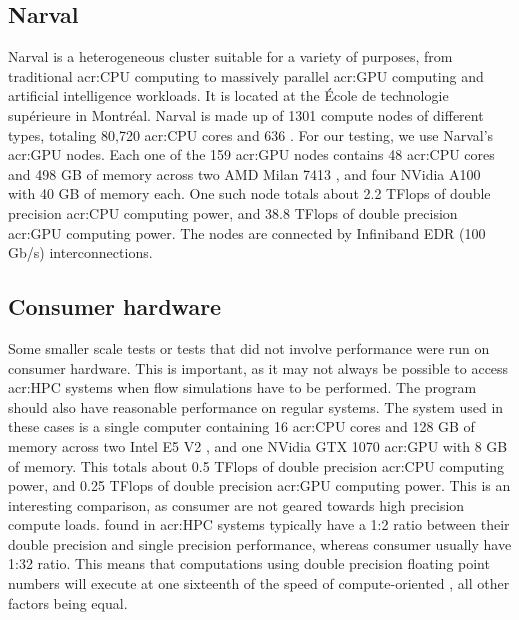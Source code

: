 \subsection{Narval}\label{subsection:results:platforms:narval}

Narval is a heterogeneous cluster suitable for a variety of purposes, from traditional
\acrshort{acr:CPU} computing to massively parallel \acrshort{acr:GPU} computing and artificial
intelligence workloads. It is located at the École de technologie supérieure in Montréal. Narval is
made up of 1301 compute nodes of different types, totaling 80,720 \acrshort{acr:CPU} cores and 636
. For our testing, we use Narval's \acrshort{acr:GPU} nodes. Each one of the 159
\acrshort{acr:GPU} nodes contains 48 \acrshort{acr:CPU} cores and 498 GB of memory across two AMD
Milan 7413 , and four NVidia A100  with 40 GB of memory
each. One such node totals about 2.2 TFlops of double precision \acrshort{acr:CPU} computing power,
and 38.8 TFlops of double precision \acrshort{acr:GPU} computing power. The nodes are connected by
Infiniband EDR (100 Gb/s) interconnections.

\subsection{Consumer hardware}\label{subsection:results:platforms:consumer}

Some smaller scale tests or tests that did not involve performance were run on consumer hardware.
This is important, as it may not always be possible to access \acrshort{acr:HPC} systems when flow
simulations have to be performed. The program should also have reasonable performance on regular
systems. The system used in these cases is a single computer containing 16 \acrshort{acr:CPU} cores
and 128 GB of memory across two Intel E5 V2 , and one NVidia GTX
1070 \acrshort{acr:GPU} with 8 GB of memory. This totals about 0.5 TFlops of double precision
\acrshort{acr:CPU} computing power, and 0.25 TFlops of double precision \acrshort{acr:GPU} computing
power. This is an interesting comparison, as consumer  are not geared towards
high precision compute loads.  found in \acrshort{acr:HPC} systems typically
have a 1:2 ratio between their double precision and single precision performance, whereas consumer
 usually have 1:32 ratio. This means that computations using double precision
floating point numbers will execute at one sixteenth of the speed of compute-oriented
, all other factors being equal.


